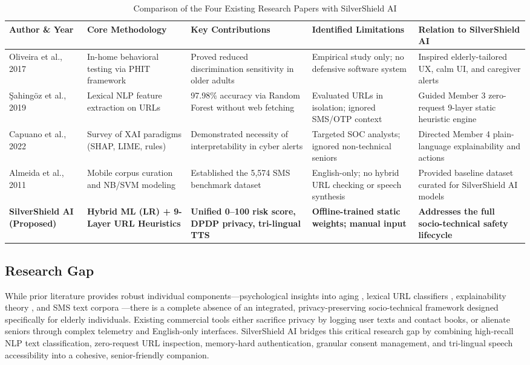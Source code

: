 \documentclass[conference]{IEEEtran}
\providecommand{\toprule}{\hline\hline}
\providecommand{\midrule}{\hline}
\providecommand{\bottomrule}{\hline\hline}
\providecommand{\addlinespace}{\vspace{0.8ex}}
\begin{document}
\begin{table}[t]
\caption{Comparison of the Four Existing Research Papers with SilverShield AI}
\label{tab:lit_comparison}
\centering
\small
\begin{tabular}{p{2.6cm}p{2.8cm}p{3.2cm}p{3.5cm}p{3.5cm}}
\toprule
\textbf{Author \& Year} & \textbf{Core Methodology} & \textbf{Key Contributions} & \textbf{Identified Limitations} & \textbf{Relation to SilverShield AI} \\
\midrule
Oliveira et al., 2017 \cite{oliveira2017dissecting} & In-home behavioral testing via PHIT framework & Proved reduced discrimination sensitivity in older adults & Empirical study only; no defensive software system & Inspired elderly-tailored UX, calm UI, and caregiver alerts \\
\addlinespace
\c{S}ahing{\"{o}}z et al., 2019 \cite{sahingoz2019machine} & Lexical NLP feature extraction on URLs & 97.98\% accuracy via Random Forest without web fetching & Evaluated URLs in isolation; ignored SMS/OTP context & Guided Member 3 zero-request 9-layer static heuristic engine \\
\addlinespace
Capuano et al., 2022 \cite{capuano2022explainable} & Survey of XAI paradigms (SHAP, LIME, rules) & Demonstrated necessity of interpretability in cyber alerts & Targeted SOC analysts; ignored non-technical seniors & Directed Member 4 plain-language explainability and actions \\
\addlinespace
Almeida et al., 2011 \cite{almeida2011contributions} & Mobile corpus curation and NB/SVM modeling & Established the 5,574 SMS benchmark dataset & English-only; no hybrid URL checking or speech synthesis & Provided baseline dataset curated for SilverShield AI models \\
\addlinespace
\textbf{SilverShield AI (Proposed)} & \textbf{Hybrid ML (LR) + 9-Layer URL Heuristics} & \textbf{Unified 0--100 risk score, DPDP privacy, tri-lingual TTS} & \textbf{Offline-trained static weights; manual input} & \textbf{Addresses the full socio-technical safety lifecycle} \\
\bottomrule
\end{tabular}
\end{table}

\subsection{Research Gap}
While prior literature provides robust individual components---psychological insights into aging \cite{oliveira2017dissecting}, lexical URL classifiers \cite{sahingoz2019machine}, explainability theory \cite{capuano2022explainable}, and SMS text corpora \cite{almeida2011contributions}---there is a complete absence of an integrated, privacy-preserving socio-technical framework designed specifically for elderly individuals. Existing commercial tools either sacrifice privacy by logging user texts and contact books, or alienate seniors through complex telemetry and English-only interfaces. SilverShield AI bridges this critical research gap by combining high-recall NLP text classification, zero-request URL inspection, memory-hard authentication, granular consent management, and tri-lingual speech accessibility into a cohesive, senior-friendly companion.
\end{document}
